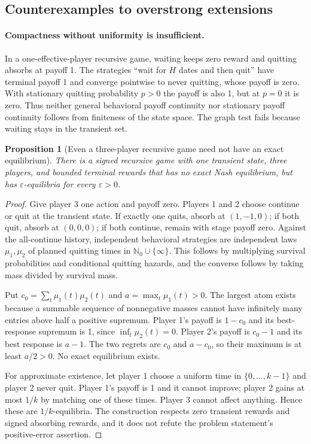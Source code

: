 \documentclass[11pt,a4paper]{article}
\newtheorem{proposition}[theorem]{Proposition}
\theoremstyle{definition}
\theoremstyle{remark}
\begin{document}
\subsection{Counterexamples to overstrong extensions}
\paragraph{Compactness without uniformity is insufficient.}
In a one-effective-player recursive game, waiting keeps zero reward and quitting absorbs at payoff 1. The strategies ``wait for $H$ dates and then quit'' have terminal payoff 1 and converge pointwise to never quitting, whose payoff is zero. With stationary quitting probability $p>0$ the payoff is also 1, but at $p=0$ it is zero. Thus neither general behavioral payoff continuity nor stationary payoff continuity follows from finiteness of the state space. The graph test fails because waiting stays in the transient set.

\begin{proposition}[Even a three-player recursive game need not have an exact equilibrium]
There is a signed recursive game with one transient state, three players, and bounded terminal rewards that has no exact Nash equilibrium, but has $\varepsilon$-equilibria for every $\varepsilon>0$.
\end{proposition}
\begin{proof}
Give player 3 one action and payoff zero. Players 1 and 2 choose continue or quit at the transient state. If exactly one quits, absorb at $(1,-1,0)$; if both quit, absorb at $(0,0,0)$; if both continue, remain with stage payoff zero. Against the all-continue history, independent behavioral strategies are independent laws $\mu_1,\mu_2$ of planned quitting times in $\mathbb N_0\cup\{\infty\}$. This follows by multiplying survival probabilities and conditional quitting hazards, and the converse follows by taking mass divided by survival mass.

Put $c_0=\sum_t\mu_1(t)\mu_2(t)$ and $a=\max_t\mu_1(t)>0$. The largest atom exists because a summable sequence of nonnegative masses cannot have infinitely many entries above half a positive supremum. Player 1's payoff is $1-c_0$ and its best-response supremum is 1, since $\inf_t\mu_2(t)=0$. Player 2's payoff is $c_0-1$ and its best response is $a-1$. The two regrets are $c_0$ and $a-c_0$, so their maximum is at least $a/2>0$. No exact equilibrium exists.

For approximate existence, let player 1 choose a uniform time in $\{0,\ldots,k-1\}$ and player 2 never quit. Player 1's payoff is 1 and it cannot improve; player 2 gains at most $1/k$ by matching one of these times. Player 3 cannot affect anything. Hence these are $1/k$-equilibria. The construction respects zero transient rewards and signed absorbing rewards, and it does not refute the problem statement's positive-error assertion.
\end{proof}
\end{document}
